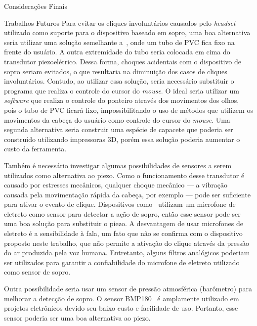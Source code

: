 \begin{chapter}{Considerações Finais}
\begin{section}{Trabalhos Futuros}
Para evitar os cliques involuntários causados pelo \textit{headset} utilizado
como suporte para o dispositivo baseado em sopro, uma boa alternativa seria
utilizar uma solução semelhante a~\cite{ok}, onde um tubo de PVC fica fixo na
frente do usuário. A outra extremidade do tubo seria colocada em cima do
transdutor piezoelétrico. Dessa forma, choques acidentais com o dispositivo de
sopro seriam evitados, o que resultaria na diminuição dos casos de cliques
involuntários. Contudo, ao utilizar essa solução, seria necessário substituir o
programa que realiza o controle do cursor do \textit{mouse}. O ideal seria
utilizar um \textit{software} que realiza o controle do ponteiro através dos
movimentos dos olhos, pois o tubo de PVC ficará fixo, impossibilitando o uso de
métodos que utilizem os movimentos da cabeça do usuário como controle do cursor
do \textit{mouse}. Uma segunda alternativa seria construir uma espécie de
capacete que poderia ser construído utilizando impressoras 3D, porém essa 
solução poderia aumentar o custo da ferramenta.  

Também é necessário investigar algumas possibilidades de sensores a serem
utilizados como alternativa ao piezo. Como o funcionamento desse transdutor é
causado por estresses mecânicos, qualquer choque mecânico --- a vibração causada
pela movimentação rápida da cabeça, por exemplo --- pode ser suficiente para
ativar o evento de clique. Dispositivos como~\cite{Sip} utilizam  um microfone
de eletreto como sensor para detectar a ação de sopro, então esse sensor pode
ser uma boa solução para substituir o piezo. A desvantagem de usar microfones de
eletreto é a sensibilidade à fala, um fato que não se confirma com o
dispositivo proposto neste trabalho, que não permite a ativação do clique através
da pressão do ar produzida pela voz humana. Entretanto, alguns filtros analógicos
poderiam ser utilizados para garantir a confiabilidade do microfone de eletreto
utilizado como sensor de sopro. 

Outra possibilidade seria usar um sensor de pressão atmosférica (barômetro) para
melhorar a detecção de sopro. O sensor BMP180~\cite{bmp180} é amplamente
utilizado em projetos eletrônicos devido seu baixo custo e facilidade de uso.
Portanto, esse sensor poderia ser uma boa alternativa ao piezo.



\end{section}
\end{chapter}
